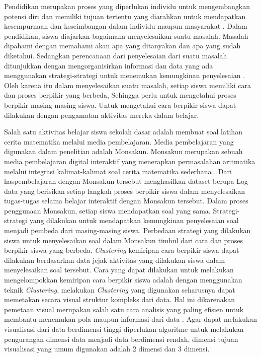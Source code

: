 Pendidikan merupakan proses yang diperlukan individu untuk mengembangkan potensi diri dan memiliki tujuan tertentu yang diarahkan untuk mendapatkan kesempurnaan dan keseimbangan dalam individu maupun masyarakat \cite{Nurkholis2013}. Dalam pendidikan, siswa diajarkan bagaimana menyelesaikan suatu masalah. Masalah dipahami dengan memahami akan apa yang ditanyakan dan apa yang sudah diketahui. Sedangkan perencanaan dari penyelesaian dari suatu masalah ditunjukkan dengan mengorganisirkan informasi dan data yang ada menggunakan strategi-strategi untuk menemukan kemungkinan penyelesaian \cite{Siswono2005}. Oleh karena itu dalam menyelesaikan suatu masalah, setiap siswa memiliki cara dan proses berpikir yang berbeda, Sehingga perlu untuk mengetahui proses berpikir masing-masing siswa. Untuk mengetahui cara berpikir siswa dapat dilakukan dengan pengamatan aktivitas mereka dalam belajar.

Salah satu aktivitas belajar siswa sekolah dasar adalah membuat soal latihan cerita matematika melalui media pembelajaran. Media pembelajaran yang digunakan dalam penelitian adalah Monsakun. Monsakun merupakan sebuah media pembelajaran digital interaktif yang menerapkan permasalahan aritmatika melalui integrasi kalimat-kalimat soal cerita matematika sederhana \cite{SupiantoHayashiHirashima2016}. Dari haspembelajaran dengan Monsakun tersebut menghasilkan dataset berupa Log data yang berisikan setiap langkah proses berpikir siswa dalam menyelesaikan tugas-tugas selama belajar interaktif dengan Monsakun tersebut. Dalam proses penggunaan Monsakun, setiap siswa mendapatkan soal yang sama. Strategi-strategi yang dilakukan untuk mendapatkan kemungkinan penyelesaian soal menjadi pembeda dari masing-masing siswa. Perbedaan strategi yang dilakukan siswa untuk menyelesaikan soal dalam Monsakun timbul dari cara dan proses berpikir siswa yang berbeda. \textit{Clustering} kemiripan cara berpikir siswa dapat dilakukan berdasarkan data jejak aktivitas yang dilakukan siswa dalam menyelesaikan soal tersebut.
Cara yang dapat dilakukan untuk melakukan mengelompokkan kemiripan cara berpikir siswa adalah dengan menggunakan teknik \textit{Clustering}, melakukan \textit{Clustering} yang digunakan seharusnya dapat memetakan secara visual struktur kompleks dari data. Hal ini dikarenakan pemetaan visual merupakan salah satu cara analisis yang paling efisien untuk membantu menemukan pola maupun informasi dari data \cite{Kreuseler2002}. Agar dapat melakukan visualisasi dari data berdimensi tinggi diperlukan algoritme untuk melakukan pengurangan dimensi data menjadi data berdimensi rendah, dimensi tujuan visualisasi yang umum digunakan adalah 2 dimensi dan 3 dimensi.

